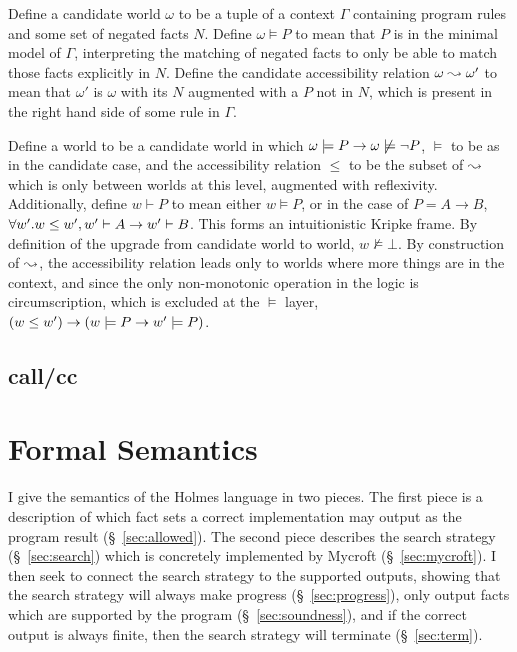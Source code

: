 Define a candidate world $\omega$ to be a tuple of a context $\Gamma$ containing program rules and some set of negated facts $N$.
Define $\omega \models P$ to mean that $P$ is in the minimal model of $\Gamma$, interpreting the matching of negated facts to only be able to match those facts explicitly in $N$.
Define the candidate accessibility relation $\omega \leadsto \omega'$ to mean that $\omega'$ is $\omega$ with its $N$ augmented with a $P$ not in $N$, which is present in the right hand side of some rule in $\Gamma$.

Define a world to be a candidate world in which $\omega \models P \rightarrow \omega \not \models \neg P$, $\models$ to be as in the candidate case, and the accessibility relation $\leq$ to be the subset of $\leadsto$ which is only between worlds at this level, augmented with reflexivity.
Additionally, define $w \vdash P$ to mean either $w \models P$, or in the case of $P = A \rightarrow B$, $\forall w'. w \leq w', w' \vdash A \rightarrow w' \vdash B$.
This forms an intuitionistic Kripke frame.
By definition of the upgrade from candidate world to world, $w \not \models \bot$.
By construction of $\leadsto$, the accessibility relation leads only to worlds where more things are in the context, and since the only non-monotonic operation in the logic is circumscription, which is excluded at the $\models$ layer, $(w \leq w') \rightarrow (w \models P \rightarrow w' \models P)$.

\subsection{call/cc}
\section{Formal Semantics}
I give the semantics of the Holmes language in two pieces.
The first piece is a description of which fact sets a correct implementation may output as the program result (\S~\ref{sec:allowed}).
The second piece describes the search strategy (\S~\ref{sec:search}) which is concretely implemented by Mycroft (\S~\ref{sec:mycroft}).
I then seek to connect the search strategy to the supported outputs, showing that the search strategy will always make progress (\S~\ref{sec:progress}), only output facts which are supported by the program (\S~\ref{sec:soundness}), and if the correct output is always finite, then the search strategy will terminate (\S~\ref{sec:term}).
